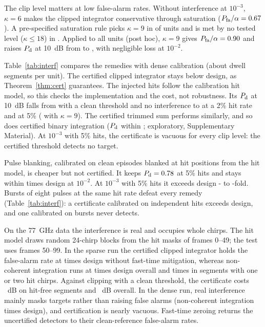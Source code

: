 \documentclass[journal]{IEEEtran}
\begin{document}
The clip level matters at low false-alarm rates. Without interference at $10^{-3}$, $\kappa=6$ makes the clipped integrator conservative through saturation ($P_{\rm fa}/\alpha=0.67$). A pre-specified saturation rule picks $\kappa=9$ in {\KappaNineUnits} of \NUnitsConf{} units and is met by no tested level ($\kappa\le18$) in \KappaRuleUndefUnits. Applied to all units (post hoc), $\kappa=9$ gives $P_{\rm fa}/\alpha=0.90$ and raises $P_{\rm d}$ at 10~dB from \KappaSixPdThree{} to \KappaNinePdThree, with negligible loss at $10^{-2}$.

Table~\ref{tab:interf} compares the remedies with dense calibration (about \DwellSegsPerUnit{} dwell segments per unit). The certified clipped integrator stays below design, as Theorem~\ref{thm:cert} guarantees. The injected hits follow the calibration hit model, so this checks the implementation and the cost, not robustness. Its $P_{\rm d}$ at 10~dB falls from \CleanClipPdTen{} with a clean threshold and no interference to \CertSixPdTwo{} at a 2\% hit rate and \CertSixPdFive{} at 5\% (\CertNinePdFive{} with $\kappa=9$). The certified trimmed sum performs similarly, and so does certified binary integration ($P_{\rm d}$ within \BinCertGapMax; exploratory, Supplementary Material). At $10^{-3}$ with 5\% hits, the certificate is vacuous for every clip level: the certified threshold detects no target.

Pulse blanking, calibrated on clean episodes blanked at hit positions from the hit model, is cheaper but not certified. It keeps $P_{\rm d}=0.78$ at 5\% hits and stays within \BlankPfaMax{} times design at $10^{-2}$. At $10^{-3}$ with 5\% hits it exceeds design \BlankFiveThreeMin- to \BlankFiveThreeMax-fold. Bursts of eight pulses at the same hit rate defeat every remedy (Table~\ref{tab:interf}): a certificate calibrated on independent hits exceeds design, and one calibrated on bursts never detects.

On the 77~GHz data the interference is real and occupies whole chirps. The hit model draws random 24-chirp blocks from the hit masks of frames 0--49; the test uses frames 50--99. In the sparse run the certified clipped integrator holds the false-alarm rate at \JCertPfaC{} times design without fast-time mitigation, whereas non-coherent integration runs at \JDinPfaC{} times design overall and \JDinPfaCone{} times in segments with one or two hit chirps. Against clipping with a clean threshold, the certificate costs \JCertCostClean~dB on hit-free segments and \JCertCostAll~dB overall. In the dense run, real interference mainly masks targets rather than raising false alarms (non-coherent integration \JDinPfaA{} times design), and certification is nearly vacuous. Fast-time zeroing returns the uncertified detectors to their clean-reference false-alarm rates.
\end{document}

